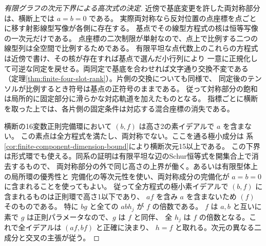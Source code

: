 \begin{proof}[有限グラフの次元下界による高次式の決定]
近傍で基底変更を許した両対称部分は、横断上では $a=b=0$ である。
実際両対称なら反対位置の点座標を点ごとに移す射影線型写像が各側に存在する。
基点でその線型方程式の核は恒等写像の一次元だけである。
点座標の二次制限が単射なので、点上で比例する二つの線型列は全空間で比例するためである。
有限平坦な点代数上のこれらの方程式は近傍で書け、その核が存在すれば基点で選んだ小行列により
一意に正規化して可逆な同定を戻せる。両同定で基底を合わせれば文字通り交換不変である
（定理\ref{thm:finite-four-slot-rank}）。片側の交換についても同様で、
同定後のテンソルが比例するとき符号は基点の正符号のままである。
従って対称部分の飽和は局所的に固定部分に滑らかな対応軌道を加えたものとなる。
指標ごとに横断を取った上では、各片側の固定条件は対応する混合座標の消失である。

横断の16変数正則完備環において $(b,f)$ は高さ2の素イデアルで $a$ を含まない。
この素点は全方程式を満たし、両対称でない。ここを通る極小成分は
系\ref{cor:finite-component-dimension-bound}により横断次元15以上である。
この下界は形式環でも使える。同系の証明は有限平坦な辺のSchur恒等式を開集合上で消去するもので、
両対称部分の外で同じ高さの上界が働く。あるいは有限型体上の局所環の優秀性と
完備化の等次元性を使い、両対称成分の完備化が $a=b=0$ に含まれることを使ってもよい。
従って全方程式の極小素イデアルで $(b,f)$ に含まれるものは正則環で高さ1以下であり、
$af$ を含み $a$ を含まないため $(f)$ そのものである。
特に $bg$ と全ての $ab h_j$ が $f$ の倍数である。
$f$ は $a,b$ と互いに素で $g$ は正則パラメータなので、$g$ は $f$ と同伴、
全 $h_j$ は $f$ の倍数となる。これで全イデアルは $(af,bf)$ と正確に決まり、
$h=f$ と取れる。次元の異なる二成分と交叉の主張が従う。
\end{proof}
